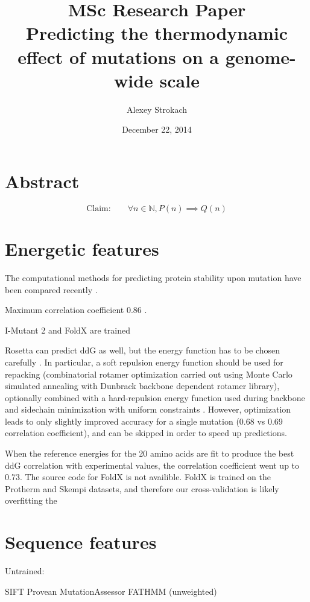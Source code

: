 \documentclass[11pt]{article}
\title{MSc Research Paper \vspace{0.2cm} \\ Predicting the thermodynamic effect of mutations on a genome-wide scale
\vspace{0.2cm}}
\author{Alexey Strokach}
\date{December 22, 2014}
\begin{document}
\maketitle

\onehalfspacing


\section*{Abstract}

$$\text{Claim:} \quad\quad \forall n \in \mathbb{N}, P(n) \implies Q(n)$$


\section{Energetic features}


The computational methods for predicting protein stability upon mutation have been compared recently \cite{Potapov2009}.

Maximum correlation coefficient 0.86 \cite{Potapov2009}.

I-Mutant 2 and FoldX are trained

Rosetta can predict ddG as well, but the energy function has to be chosen carefully \cite{Kellogg2011}. In particular, a soft repulsion energy function should be used for repacking (combinatorial rotamer optimization carried out using Monte Carlo simulated annealing with Dunbrack backbone dependent rotamer library), optionally combined with a hard-repulsion energy function used during backbone and sidechain minimization with uniform constraints \cite{Kellogg2011}. However, optimization leads to only slightly improved accuracy for a single mutation (0.68 vs 0.69 correlation coefficient), and can be skipped in order to speed up predictions. 

When the reference energies for the 20 amino acids are fit to produce the best ddG correlation with experimental values, the correlation coefficient went up to 0.73. 
The source code for FoldX is not availible. FoldX is trained on the Protherm and Skempi datasets, and therefore our cross-validation is likely overfitting the 



\section{Sequence features}

Untrained:

SIFT
Provean 
MutationAssessor
FATHMM (unweighted)
\end{document}
